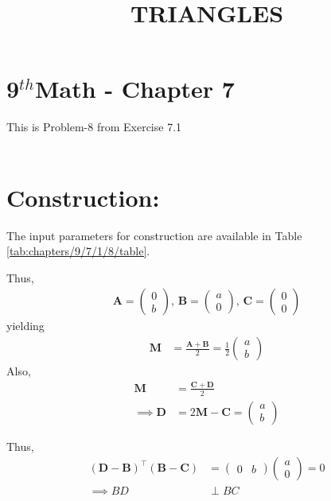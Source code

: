\documentclass[10pt]{article}
\providecommand{\brak}[1]{\ensuremath{\left(#1\right)}}
\newcommand{\solution}{\noindent \textbf{Solution: }}
\newcommand{\myvec}[1]{\ensuremath{\begin{pmatrix}#1\end{pmatrix}}}
\let\vec\mathbf{}
\begin{document}
\begin{center}
\title{\textbf{TRIANGLES}}
\date{\vspace{-5ex}}
\maketitle
\end{center}
\section*{9$^{th}$Math - Chapter 7}
This is Problem-8 from Exercise 7.1\\\\


\section*{\large Construction:}
\fi
The input parameters for construction
	are available in Table \ref{tab:chapters/9/7/1/8/table}.
\begin{table}[H]
	\centering
     
	\caption{}
	\label{tab:chapters/9/7/1/8/table}
\end{table}
Thus, 
\begin{align}
	\vec{A}=\myvec{0\\b},\,
	\vec{B}=\myvec{a\\0},\,
	\vec{C}=\myvec{0\\0}
\end{align}
yielding
\begin{align}
	\vec{M}&=\frac{\vec{A}+\vec{B}}{2}=\frac{1}{2}\myvec{a\\b}
\end{align}
Also, 
\begin{align}
	\vec{M}&=\frac{\vec{C}+\vec{D}}{2}\\
	\implies \vec{D}&=2\vec{M}-\vec{C}=\myvec{a\\b}
\end{align}
\iffalse
\solution
Given
\begin{align}
	\vec{M}&=\frac{\vec{A}+\vec{B}}{2}
	\label{eq:chapters/9/7/1/8/1}\\
	\vec{D}-\vec{M}&=\vec{C}-\vec{M}
	\label{eq:chapters/9/7/1/8/2}\\
	\angle ACB&=90\degree
\end{align}
\textbf{Proof:} From Figure \ref{fig:chapters/9/7/1/8/1}
\fi
Thus,
\begin{align}
	\brak{\vec{D}-\vec{B}}^{\top}\brak{\vec{B}-\vec{C}} &= \myvec{0 & b}\myvec{a\\0}=0\\
	\implies BD & \perp BC\\
\end{align}
\end{document}
